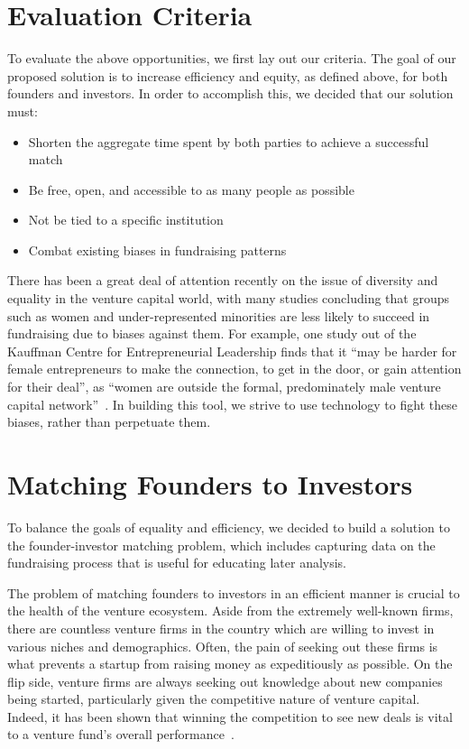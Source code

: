\section{Evaluation Criteria}

To evaluate the above opportunities, we first lay out our criteria. The goal of our proposed solution is to increase efficiency and equity, as defined above, for both founders and investors. In order to accomplish this, we decided that our solution must:

\begin{itemize}
  \item Shorten the aggregate time spent by both parties to achieve a successful match
  \item Be free, open, and accessible to as many people as possible
  \item Not be tied to a specific institution
  \item Combat existing biases in fundraising patterns
\end{itemize}

There has been a great deal of attention recently on the issue of diversity and equality in the venture capital world, with many studies concluding that groups such as women and under-represented minorities are less likely to succeed in fundraising due to biases against them. For example, one study out of the Kauffman Centre for Entrepreneurial Leadership finds that it ``may be harder for female entrepreneurs to make the connection, to get in the door, or gain attention for their deal'', as ``women are outside the formal, predominately male venture capital network''~\cite{doi:10.1080/13691060118175}. In building this tool, we strive to use technology to fight these biases, rather than perpetuate them.

\section{Matching Founders to Investors}
\label{ch2:matching}

To balance the goals of equality and efficiency, we decided to build a solution to the founder-investor matching problem, which includes capturing data on the fundraising process that is useful for educating later analysis.

The problem of matching founders to investors in an efficient manner is crucial to the health of the venture ecosystem. Aside from the extremely well-known firms, there are countless venture firms in the country which are willing to invest in various niches and demographics. Often, the pain of seeking out these firms is what prevents a startup from raising money as expeditiously as possible. On the flip side, venture firms are always seeking out knowledge about new companies being started, particularly given the competitive nature of venture capital. Indeed, it has been shown that winning the competition to see new deals is vital to a venture fund's overall performance~\cite{doi:10.1111/j.1540-6261.2007.01207.x}.

